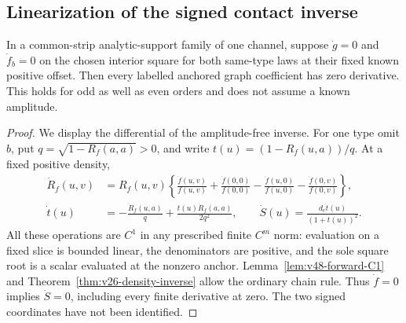 \subsection{Linearization of the signed contact inverse}

\begin{lemma}
\label{lem:v48-local-kernel}
In a common-strip analytic-support family of one channel, suppose
$\dot g=0$ and $\dot f_b=0$ on the chosen interior square for both
same-type laws at their fixed known positive offset.  Then every
labelled anchored graph coefficient has zero derivative.  This holds
for odd as well as even orders and does not assume a known amplitude.
\end{lemma}

\begin{proof}
We display the differential of the amplitude-free inverse.  For one
type omit $b$, put $q=\sqrt{1-R_f(a,a)}>0$, and write
$t(u)=(1-R_f(u,a))/q$.  At a fixed positive density,
\begin{align}
 \dot R_f(u,v)&=R_f(u,v)\left\{
    \frac{\dot f(u,v)}{f(u,v)}+\frac{\dot f(0,0)}{f(0,0)}
   -\frac{\dot f(u,0)}{f(u,0)}-\frac{\dot f(0,v)}{f(0,v)}\right\},
                         \label{eq:v48-ratio-differential}\\
 \dot t(u)&=-\frac{\dot R_f(u,a)}q
                   +\frac{t(u)\dot R_f(a,a)}{2q^2},\qquad
 \dot S(u)=\frac{d_e\dot t(u)}{(1+t(u))^2}.
                         \label{eq:v48-action-differential}
\end{align}
All these operations are $C^1$ in any prescribed finite $C^m$ norm:
evaluation on a fixed slice is bounded linear, the denominators are
positive, and the sole square root is a scalar evaluated at the nonzero
anchor.  Lemma~\ref{lem:v48-forward-C1} and
Theorem~\ref{thm:v26-density-inverse} allow the ordinary chain rule.
Thus $\dot f=0$ implies $\dot S=0$, including every finite derivative
at zero.  The two signed coordinates have not been identified.


\end{proof}
